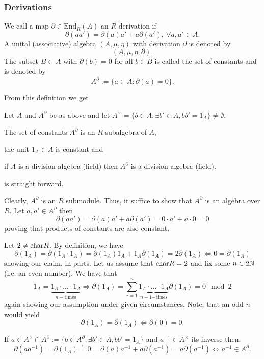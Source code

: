 \subsubsection{Derivations}
\begin{defi}
We call a map $\partial \in \mathrm{End}_R(A)$ an $R$ derivation if
$$\partial(a a') = \partial(a) a' + a \partial(a'),\ \forall a, a' \in A.$$
A unital (associative) algebra $(A, \mu, \eta)$ with derivation $\partial$ is denoted by
$$(A, \mu, \eta, \partial).$$
The subset $B \subset A$ with $\partial(b) = 0$ for all $b \in B$ is called the set of constants and is denoted by
$$A^\partial := \{a \in A : \partial(a) = 0\}.$$
\end{defi}
From this definition we get
\begin{koro}
Let $A$ and $A^\partial$ be as above and let $A^\times = \{b \in A : \exists b' \in A, b b' = 1_A\} \neq \emptyset$.
\bn
\item The set of constants $A^\partial$ is an $R$ subalgebra of $A$,
\item the unit $1_A \in A$ is constant and
\item if $A$ is a division algebra (field) then $A^\partial$ is a division algebra (field).
\en
\end{koro}
\bws is straight forward.
\bn
\item Clearly, $A^\partial$ is an $R$ submodule. Thus, it suffice to show that $A^\partial$ is an algebra over $R$. Let $a, a' \in A^\partial$ then
$$\partial(a a') = \partial(a) a' + a \partial(a') = 0 \cdot a' + a \cdot 0 = 0$$
proving that products of constants are also constant.
\item Let $2 \neq \mathrm{char} R$. By definition, we have
$$\partial(1_A) = \partial(1_A \cdot 1_A) = \partial(1_A) 1_A + 1_A \partial(1_A) = 2 \partial(1_A) \Leftrightarrow 0 = \partial(1_A)$$
showing our claim, in parts. Let us assume that $\mathrm{char} R = 2$ and fix some $n \in 2 \mathbb{N}$ (i.e. an even number). We have that
$$1_A = \underbrace{1_A \cdot \ldots \cdot 1_A}_{n-\mathrm{times}} \Rightarrow \partial(1_A) = \sum_{i=1}^n \underbrace{1_A \cdot \ldots \cdot 1_A}_{n-1\mathrm{-times}} \partial(1_A) = 0 \mod 2$$
again showing our assumption under given circumstances. Note, that an odd $n$ would yield
$$\partial(1_A) = \partial(1_A) \Leftrightarrow \partial(0) = 0.$$
\item If $a \in A^\times \cap A^\partial := \{b \in A^\partial : \exists b' \in A, b b' = 1_A\}$ and $a^{-1} \in A^\times$ its inverse then:
$$\partial(a a^{-1}) = \partial(1_A) \stackrel{!}{=} 0 = \partial(a) a^{-1} + a \partial(a^{-1}) = a \partial(a^{-1}) \Leftrightarrow a^{-1} \in A^\partial.$$
